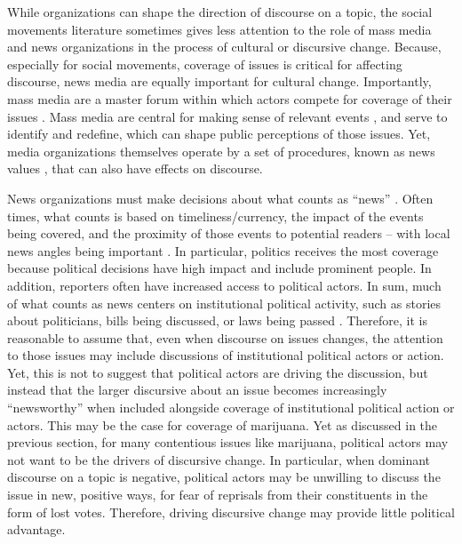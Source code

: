 While organizations can shape the direction of discourse on a topic, the social movements literature sometimes gives less attention to the role of mass media and news organizations in the process of cultural or discursive change. Because, especially for social movements, coverage of issues is critical for affecting discourse, news media are equally important for cultural change. Importantly, mass media are a master forum \citep{ferree_et_al_2002} within which actors compete for coverage of their issues \citep{amenta_et_al_2012}.  Mass media are central for making sense of relevant events \citep{gamson_and_modigliani_1989}, and serve to identify and redefine, which can shape public perceptions of those issues. Yet, media organizations themselves operate by a set of procedures, known as news values \citep{galtung_and_ruge_1965}, that can also have effects on discourse. 


News organizations must make decisions about what counts as ``news'' \citep{galtung_and_ruge_1965}. Often times, what counts is based on timeliness/currency, the impact of the events being covered, and the proximity of those events to potential readers -- with local news angles being important \citep{amenta_et_al_2012,galtung_and_ruge_1965}. In particular, politics receives the most coverage because political decisions have high impact and include prominent people. In addition, reporters often have increased access to political actors. In sum, much of what counts as news centers on institutional political activity, such as stories about politicians, bills being discussed, or laws being passed \citep{amenta_et_al_2012}. Therefore, it is reasonable to assume that, even when discourse on issues changes, the attention to those issues may include discussions of institutional political actors or action. Yet, this is not to suggest that political actors are driving the discussion, but instead that the larger discursive about an issue becomes increasingly ``newsworthy'' when included alongside coverage of institutional political action or actors. This may be the case for coverage of marijuana. Yet as discussed in the previous section, for many contentious issues like marijuana, political actors may not want to be the drivers of discursive change. In particular, when dominant discourse on a topic is negative, political actors may be unwilling to discuss the issue in new, positive ways, for fear of reprisals from their constituents in the form of lost votes. Therefore, driving discursive change may provide little political advantage. 



